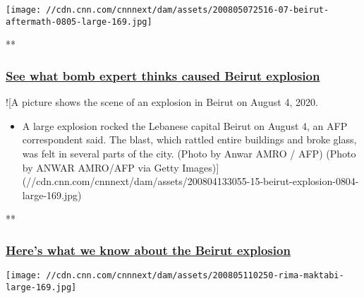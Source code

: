 \href{/videos/world/2020/08/05/ammonium-nitrate-beirut-lebanon-explosion-sam-kiley-pkg-vpx.cnn/video/playlists/beirut-explosion/}{}

\texttt{[image: //cdn.cnn.com/cnnnext/dam/assets/200805072516-07-beirut-aftermath-0805-large-169.jpg]}

**

\hypertarget{see-what-bomb-expert-thinks-caused-beirut-explosion}{%
\subsubsection{\texorpdfstring{\href{/videos/world/2020/08/05/ammonium-nitrate-beirut-lebanon-explosion-sam-kiley-pkg-vpx.cnn/video/playlists/beirut-explosion/}{See
what bomb expert thinks caused Beirut
explosion}}{See what bomb expert thinks caused Beirut explosion}}\label{see-what-bomb-expert-thinks-caused-beirut-explosion}}

\href{/videos/world/2020/08/04/beirut-explosion-video-mss-orig.cnn/video/playlists/beirut-explosion/}{}

!{[}A picture shows the scene of an explosion in Beirut on August 4,
2020.

\begin{itemize}
\tightlist
\item
  A large explosion rocked the Lebanese capital Beirut on August 4, an
  AFP correspondent said. The blast, which rattled entire buildings and
  broke glass, was felt in several parts of the city. (Photo by Anwar
  AMRO / AFP) (Photo by ANWAR AMRO/AFP via Getty
  Images){]}(//cdn.cnn.com/cnnnext/dam/assets/200804133055-15-beirut-explosion-0804-large-169.jpg)
\end{itemize}

**

\hypertarget{heres-what-we-know-about-the-beirut-explosion}{%
\subsubsection{\texorpdfstring{\href{/videos/world/2020/08/04/beirut-explosion-video-mss-orig.cnn/video/playlists/beirut-explosion/}{Here's
what we know about the Beirut
explosion}}{Here's what we know about the Beirut explosion}}\label{heres-what-we-know-about-the-beirut-explosion}}

\href{/videos/world/2020/08/05/rima-maktabi-journalist-home-destroyed-beirut-explosion-ctw-vpx.cnn/video/playlists/beirut-explosion/}{}

\texttt{[image: //cdn.cnn.com/cnnnext/dam/assets/200805110250-rima-maktabi-large-169.jpg]}

